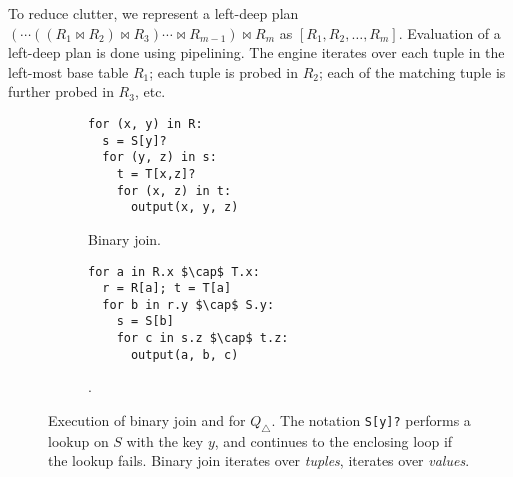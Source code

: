 To reduce clutter, we represent a left-deep plan
$(\cdots ((R_1 \Join R_2) \Join R_3) \cdots \Join R_{m-1}) \Join R_m$
as $[R_1, R_2, \ldots, R_m]$.  Evaluation of a left-deep plan is done
using pipelining.  The engine iterates over each tuple in the
left-most base table $R_1$; each tuple is probed in $R_2$; each of the
matching tuple is further probed in $R_3$, etc.


\begin{figure}
  \begin{subfigure}[b]{0.25\linewidth}
\begin{lstlisting}
for (x, y) in R:
  s = S[y]?
  for (y, z) in s:
    t = T[x,z]?
    for (x, z) in t:
      output(x, y, z)
\end{lstlisting}
\caption{Binary join.}
\label{fig:background:binary-join}
  \end{subfigure}
\hspace{2cm}
  \begin{subfigure}[b]{0.25\linewidth}
    \centering
\begin{lstlisting}
for a in R.x $\cap$ T.x:
  r = R[a]; t = T[a]
  for b in r.y $\cap$ S.y:
    s = S[b]
    for c in s.z $\cap$ t.z:
      output(a, b, c)
\end{lstlisting}
    \caption{\GJ.}
    \label{fig:background:gj}
  \end{subfigure}
  \caption{Execution of binary join and \GJ for $Q_\triangle$.  The
    notation \lstinline|S[y]?| performs a lookup on $S$ with the key
    $y$, and continues to the enclosing loop if the lookup fails.
    Binary join iterates over {\em tuples}, \GJ iterates over {\em
      values}.}
\end{figure}

